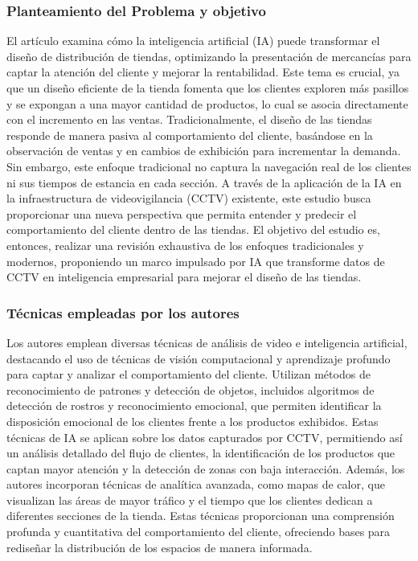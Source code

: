 \subsubsection{Planteamiento del Problema y objetivo }
El artículo examina cómo la inteligencia artificial (IA) puede transformar el diseño de distribución de tiendas, optimizando la presentación de mercancías para captar la atención del cliente y mejorar la rentabilidad. Este tema es crucial, ya que un diseño eficiente de la tienda fomenta que los clientes exploren más pasillos y se expongan a una mayor cantidad de productos, lo cual se asocia directamente con el incremento en las ventas. Tradicionalmente, el diseño de las tiendas responde de manera pasiva al comportamiento del cliente, basándose en la observación de ventas y en cambios de exhibición para incrementar la demanda. Sin embargo, este enfoque tradicional no captura la navegación real de los clientes ni sus tiempos de estancia en cada sección. A través de la aplicación de la IA en la infraestructura de videovigilancia (CCTV) existente, este estudio busca proporcionar una nueva perspectiva que permita entender y predecir el comportamiento del cliente dentro de las tiendas. El objetivo del estudio es, entonces, realizar una revisión exhaustiva de los enfoques tradicionales y modernos, proponiendo un marco impulsado por IA que transforme datos de CCTV en inteligencia empresarial para mejorar el diseño de las tiendas.




\subsubsection{Técnicas empleadas por los autores}
Los autores emplean diversas técnicas de análisis de video e inteligencia artificial, destacando el uso de técnicas de visión computacional y aprendizaje profundo para captar y analizar el comportamiento del cliente. Utilizan métodos de reconocimiento de patrones y detección de objetos, incluidos algoritmos de detección de rostros y reconocimiento emocional, que permiten identificar la disposición emocional de los clientes frente a los productos exhibidos. Estas técnicas de IA se aplican sobre los datos capturados por CCTV, permitiendo así un análisis detallado del flujo de clientes, la identificación de los productos que captan mayor atención y la detección de zonas con baja interacción. Además, los autores incorporan técnicas de analítica avanzada, como mapas de calor, que visualizan las áreas de mayor tráfico y el tiempo que los clientes dedican a diferentes secciones de la tienda. Estas técnicas proporcionan una comprensión profunda y cuantitativa del comportamiento del cliente, ofreciendo bases para rediseñar la distribución de los espacios de manera informada.


